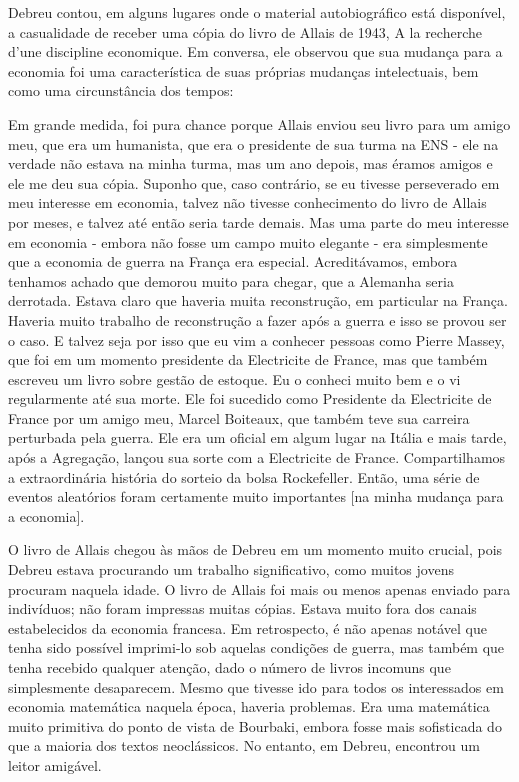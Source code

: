 \documentclass[12pt]{article}
\begin{document}
Debreu contou, em alguns lugares onde o material autobiográfico está disponível, a casualidade de receber uma cópia do livro de Allais de 1943, A la recherche d’une discipline economique. Em conversa, ele observou que sua mudança para a economia foi uma característica de suas próprias mudanças intelectuais, bem como uma circunstância dos tempos:

Em grande medida, foi pura chance porque Allais enviou seu livro para um amigo meu, que era um humanista, que era o presidente de sua turma na ENS - ele na verdade não estava na minha turma, mas um ano depois, mas éramos amigos e ele me deu sua cópia. Suponho que, caso contrário, se eu tivesse perseverado em meu interesse em economia, talvez não tivesse conhecimento do livro de Allais por meses, e talvez até então seria tarde demais. Mas uma parte do meu interesse em economia - embora não fosse um campo muito elegante - era simplesmente que a economia de guerra na França era especial. Acreditávamos, embora tenhamos achado que demorou muito para chegar, que a Alemanha seria derrotada. Estava claro que haveria muita reconstrução, em particular na França. Haveria muito trabalho de reconstrução a fazer após a guerra e isso se provou ser o caso. E talvez seja por isso que eu vim a conhecer pessoas como Pierre Massey, que foi em um momento presidente da Electricite de France, mas que também escreveu um livro sobre gestão de estoque. Eu o conheci muito bem e o vi regularmente até sua morte. Ele foi sucedido como Presidente da Electricite de France por um amigo meu, Marcel Boiteaux, que também teve sua carreira perturbada pela guerra. Ele era um oficial em algum lugar na Itália e mais tarde, após a Agregação, lançou sua sorte com a Electricite de France. Compartilhamos a extraordinária história do sorteio da bolsa Rockefeller. Então, uma série de eventos aleatórios foram certamente muito importantes [na minha mudança para a economia].

O livro de Allais chegou às mãos de Debreu em um momento muito crucial, pois Debreu estava procurando um trabalho significativo, como muitos jovens procuram naquela idade. O livro de Allais foi mais ou menos apenas enviado para indivíduos; não foram impressas muitas cópias. Estava muito fora dos canais estabelecidos da economia francesa. Em retrospecto, é não apenas notável que tenha sido possível imprimi-lo sob aquelas condições de guerra, mas também que tenha recebido qualquer atenção, dado o número de livros incomuns que simplesmente desaparecem. Mesmo que tivesse ido para todos os interessados em economia matemática naquela época, haveria problemas. Era uma matemática muito primitiva do ponto de vista de Bourbaki, embora fosse mais sofisticada do que a maioria dos textos neoclássicos. No entanto, em Debreu, encontrou um leitor amigável.
\end{document}
